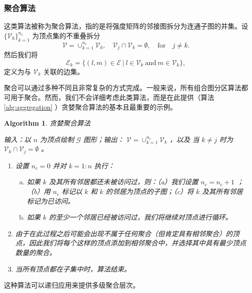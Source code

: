 \documentclass[12pt]{acta_2011xz}
\newtheorem{algorithm}[equation]{Algorithm}
\begin{document}
   \subsubsection{聚合算法  }    这类算法被称为聚合算法，指的是将强度矩阵的邻接图拆分为连通子图的并集。设
   $ \{ \mathcal{V}_k \} _{k=1}^{n_c}$    为顶点集的不重叠拆分
   \[
\mathcal{V}=\cup_{k=1}^{n_c}\mathcal{V}_k, \quad
\mathcal{V}_j\cap\mathcal{V}_k=\emptyset, \quad \mbox{for}\quad j\neq
k. 
\]    然后我们将
   \begin{equation}\label{eq:edgesk}
\mathcal{E}_k =  \{ (l,m)\in\mathcal{E}~\big|~ l\in
\mathcal{V}_k~ \mbox{and}~ m\in\mathcal{V}_k \} ,
\end{equation}    定义为与    $\mathcal{V}_k$    关联的边集。  

聚合可以通过多种不同且非常复杂的方式完成。一般来说，所有组合图分区算法都可用于聚合。然而，我们不会详细考虑此类算法，而是在此提供（算法~    \ref{alg:aggregation}   ）贪婪聚合算法的基本且最重要的示例。  

   \begin{algorithm}   \caption{贪婪聚合算法    \label{alg:aggregation}     }    输入：以    $n$    为顶点绘制    $\mathcal{G}$    图形；输出：   $\mathcal{V}=\cup_{k=1}^{n_c}\mathcal{V}_k$    ，以及
当    $k\neq j$    时为    $\mathcal{V}_k\cap \mathcal{V}_j = \emptyset$    。
   \begin{enumerate}[1.]

   \item   设置          $n_c=0$          并对          $k=1:n$          执行：
   \begin{enumerate}    [a.]   \item   如果          $k$          及其所有邻居都还未被访问过，则：（a）我们设置          $n_c=n_c + 1$          ；（b）用          $n_c$          标记以          $k$          和          $k$          的邻居为顶点的子图；（c）将          $k$          及其所有邻居标记为已访问。   \item   如果          $k$          的至少一个邻居已经被访问过，我们将继续对顶点进行循环。  \end{enumerate}      \item   由于在此过程之后可能会出现不属于任何聚合（但肯定具有相邻聚合）的顶点，因此我们将每个这样的顶点添加到相邻聚合中，并选择其中具有最少顶点数量的聚合。   \item   当所有顶点都在子集中时，算法结束。
   \end{enumerate}     \end{algorithm}    这种算法可以递归应用来提供多级聚合层次。  
\end{document}
